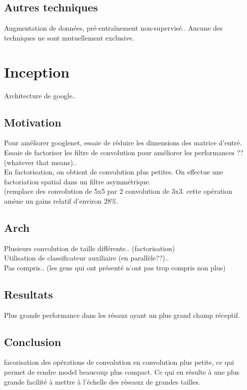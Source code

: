\documentclass[oneside]{book}
\begin{document}
\subsection{Autres techniques} 
Augmentation de données, pré-entraînement non-supervisé.. Aucune des techniques ne sont mutuellement exclusive.\\

\section{Inception}
Architecture de google.. 
\subsection{Motivation}
Pour améliorer googlenet, essaie de réduire les dimensions des matrice d'entré. Essaie de factoriser les filtre de convolution pour améliorer les performances ?? (whatever that means)..\\

En factorisation, on obtient de convolution plus petites. On effectue une factoriation spatial dans un filtre asymmétrique.\\

(remplace des convolution de 5x5 par 2 convolution de 3x3. cette opération amène un gains relatif d'environ 28\%. 
\subsection{Arch}
Plusieurs convolution de taille différente.. (factorisation)\\

Utilisation de classificateur auxiliaire (en parallèle??)..  \\

Pas compris.. (les gens qui ont présenté n'ont pas trop compris non plus)\\
\subsection{Resultats}
Plus grande performance dans les résaux ayant un plus grand champ réceptif.

\subsection{Conclusion}
facorisation des opérations de convolution en convolution plus petite, ce qui permet de rendre model beaucoup plus compact. Ce qui en résulte à une plus grande facilité à mettre à l'échelle des réseaux de grandes tailles.\\
\end{document}
